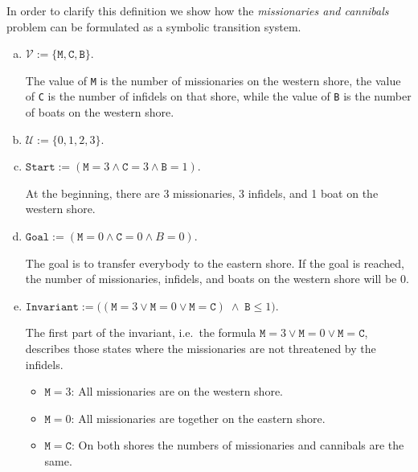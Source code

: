 In order to clarify this definition we show how the \emph{missionaries and cannibals} problem can be formulated as
a symbolic transition system.
\begin{enumerate}[(a)]
\item $\mathcal{V} := \{ \mathtt{M}, \mathtt{C}, \mathtt{B} \}$.

      The value of \texttt{M} is the number of missionaries on the western shore, the value of \texttt{C} is
      the number of infidels on that shore, while the value of \texttt{B} is the number of boats on the western
      shore.
\item $\mathcal{U} := \{ 0, 1, 2, 3 \}$.
\item $\texttt{Start} := (\mathtt{M} = 3 \wedge \mathtt{C} = 3 \wedge \mathtt{B} = 1)$.

      At the beginning, there are 3 missionaries, 3 infidels, and 1 boat on the western shore.
\item $\texttt{Goal}  := (\mathtt{M} = 0 \wedge \mathtt{C} = 0 \wedge B = 0)$.

      The goal is to transfer everybody to the eastern shore.  If the goal is reached, the number of
      missionaries, infidels, and boats on the western shore will be $0$.
\item $\texttt{Invariant} := \bigl((\mathtt{M} = 3 \vee \mathtt{M} = 0 \vee \mathtt{M} = \mathtt{C}) \;\wedge\; \mathtt{B} \leq 1\bigr)$.

      The first part of the invariant, i.e.~the formula $\mathtt{M} = 3 \vee \mathtt{M} = 0 \vee \mathtt{M} = \mathtt{C}$,
      describes those states where the missionaries are not threatened by the infidels.
      \begin{itemize}
      \item $\mathtt{M} = 3$: All missionaries are on the western shore.
      \item $\mathtt{M} = 0$: All missionaries are together on the eastern shore.
      \item $\mathtt{M} = \mathtt{C}$: On both shores the numbers of missionaries and cannibals are the same.


\end{itemize}
\end{enumerate}
